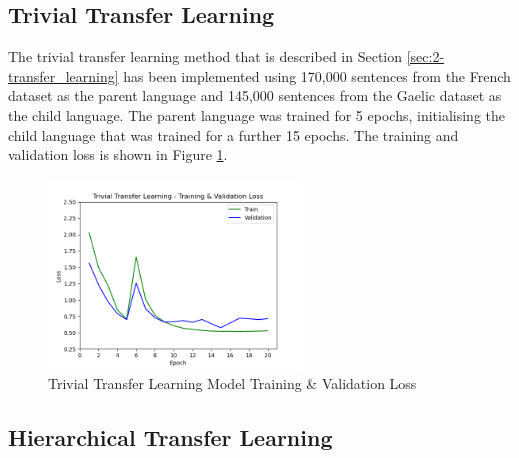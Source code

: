



\subsection{Trivial Transfer Learning}
\label{sec:4-trivial}

The trivial transfer learning method that is described in Section \ref{sec:2-transfer_learning} has been implemented using 170,000 sentences from the French dataset as the parent language and 145,000 sentences from the Gaelic dataset as the child language. The parent language was trained for 5 epochs, initialising the child language that was trained for a further 15 epochs. The training and validation loss is shown in Figure \ref{fig:loss_trivial}.



\begin{figure}[ht!]
\centering
\includegraphics[width=0.6\textwidth]{media/experiments/loss/loss_trivial.png}
\captionsetup{justification=centering}
\caption[Baseline Model Training \& Validation Loss]{Trivial Transfer Learning Model Training \& Validation Loss}
\label{fig:loss_trivial}
\end{figure}



\subsection{Hierarchical Transfer Learning}
\label{sec:4-hierarchical}

